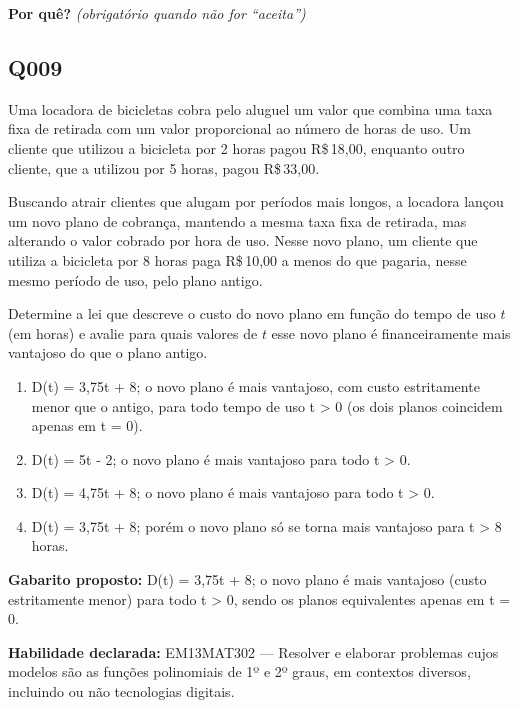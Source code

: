 \documentclass[11pt,a4paper]{article}
\begin{document}
\textbf{Por quê?} \emph{(obrigatório quando não for ``aceita'')}

\underline{\hspace{\linewidth}}

\underline{\hspace{\linewidth}}
\vspace{0.6em}

\begin{samepage}
\subsection*{Q009}
Uma locadora de bicicletas cobra pelo aluguel um valor que combina uma taxa fixa de retirada com um valor proporcional ao número de horas de uso. Um cliente que utilizou a bicicleta por 2 horas pagou R\$\,18,00, enquanto outro cliente, que a utilizou por 5 horas, pagou R\$\,33,00.

Buscando atrair clientes que alugam por períodos mais longos, a locadora lançou um novo plano de cobrança, mantendo a mesma taxa fixa de retirada, mas alterando o valor cobrado por hora de uso. Nesse novo plano, um cliente que utiliza a bicicleta por 8 horas paga R\$\,10,00 a menos do que pagaria, nesse mesmo período de uso, pelo plano antigo.

Determine a lei que descreve o custo do novo plano em função do tempo de uso $t$ (em horas) e avalie para quais valores de $t$ esse novo plano é financeiramente mais vantajoso do que o plano antigo.
\begin{enumerate}[label=(\alph*),nosep,leftmargin=*]
\item D(t) = 3,75t + 8; o novo plano é mais vantajoso, com custo estritamente menor que o antigo, para todo tempo de uso t > 0 (os dois planos coincidem apenas em t = 0).
\item D(t) = 5t - 2; o novo plano é mais vantajoso para todo t > 0.
\item D(t) = 4,75t + 8; o novo plano é mais vantajoso para todo t > 0.
\item D(t) = 3,75t + 8; porém o novo plano só se torna mais vantajoso para t > 8 horas.
\end{enumerate}

\textbf{Gabarito proposto:} D(t) = 3,75t + 8; o novo plano é mais vantajoso (custo estritamente menor) para todo t > 0, sendo os planos equivalentes apenas em t = 0.

\textbf{Habilidade declarada:} EM13MAT302 --- Resolver e elaborar problemas cujos modelos são as funções polinomiais de 1º e 2º graus, em contextos diversos, incluindo ou não tecnologias digitais.
\end{samepage}
\end{document}
